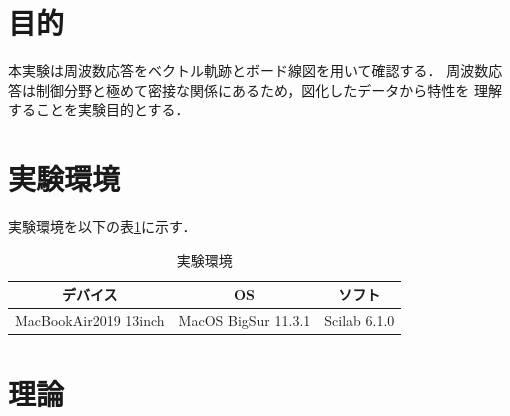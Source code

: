 \documentclass[a4paper,11pt]{jsarticle}
\begin{document}
\section{目的}
本実験は周波数応答をベクトル軌跡とボード線図を用いて確認する．
周波数応答は制御分野と極めて密接な関係にあるため，図化したデータから特性を
理解することを実験目的とする．

\section{実験環境}
実験環境を以下の表\ref{em}に示す．
\begin{table}[H]
  \begin{center}
    \caption{実験環境}
    \begin{tabular}{|c|c|c|}  \hline
      デバイス              & OS                  & ソフト       \\ \hline
      MacBookAir2019 13inch & MacOS BigSur 11.3.1 & Scilab 6.1.0 \\ \hline
    \end{tabular}
    \label{em}
  \end{center}
\end{table}

\section{理論}
\end{document}
